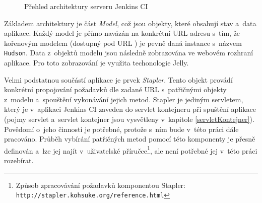             \begin{figure}[ht]
                \begin{center}
                    \caption{Přehled architektury serveru Jenkins CI \cite{architectureOverview}}
                    \label{imgJenkinsArchitecture}
                \end{center}
            \end{figure}     

            Základem architektury je část \emph{Model}, což jsou objekty, které obsahují stav
            a~data aplikace. Každý model je přímo navázán na konkrétní URL adresu s~tím, že kořenovým
            modelem (dostupný pod URL \uv{/}) je pevně daná instance s~názvem \texttt{Hudson}.
            Data z~objektů modelu jsou následně zobrazována ve webovém rozhraní aplikace.
            Pro toto zobrazování je využita techonologie Jelly.

            Velmi podstatnou součástí aplikace je prvek \emph{Stapler}. Tento objekt
            provádí konkrétní propojování požadavků dle zadané URL s~patřičnými objekty
            z~modelu a~spouštění vykonávání jejich metod. Stapler je
            jediným servletem, který je v~aplikaci Jenkins CI zaveden do
            servlet kontejneru při spuštění aplikace (pojmy servlet a~servlet kontejner 
            jsou vysvětleny v~kapitole \ref{servletKontejner}).
            Povědomí o~jeho
            činnosti je potřebné, protože s~ním bude v~této práci dále pracováno.
            Průběh vybírání patřičných metod pomocí této komponenty je přesně
            definován a~lze jej najít v~uživatelské příručce\footnote{
                Způsob zpracovávání požadavků komponentou Stapler:
                \texttt{http://stapler.kohsuke.org/reference.html}}, 
                ale není potřebné jej v~této práci rozebírat.

